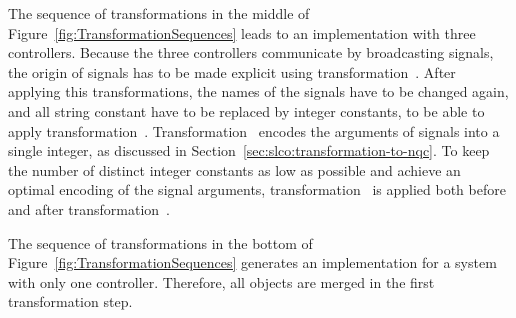 The sequence of transformations in the middle of Figure~\ref{fig:TransformationSequences} leads to an implementation with three controllers.
Because the three controllers communicate by broadcasting signals, the origin of signals has to be made explicit using transformation~.
After applying this transformations, the names of the signals have to be changed again, and all string constant have to be replaced by integer constants, to be able to apply transformation~.
Transformation~ encodes the arguments of signals into a single integer, as discussed in Section~\ref{sec:slco:transformation-to-nqc}.
To keep the number of distinct integer constants as low as possible and achieve an optimal encoding of the signal arguments, transformation~ is applied both before and after transformation~.

The sequence of transformations in the bottom of Figure~\ref{fig:TransformationSequences} generates an implementation for a system with only one controller. Therefore, all objects are merged in the first transformation step. 